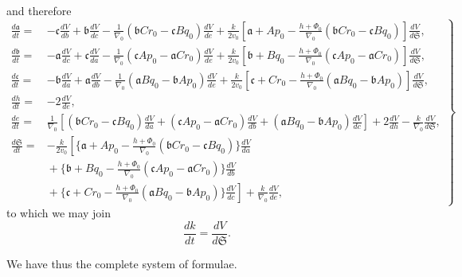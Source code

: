 \documentclass[11pt]{article}
\begin{document}
\newpage
\setcounter{page}{252}

and therefore
\[
\left.
\begin{aligned}
\frac{d\mathfrak{a}}{dt} = {}& -\mathfrak{c}\frac{dV}{db} + \mathfrak{b}\frac{dV}{dc} - \tfrac{1}{\nabla_0}(\mathfrak{b}Cr_0 - \mathfrak{c}Bq_0)\frac{dV}{de} + \tfrac{k}{2v_0}\!\left[\mathfrak{a} + Ap_0 - \tfrac{h + \Phi_0}{\nabla_0}(\mathfrak{b}Cr_0 - \mathfrak{c}Bq_0)\right]\frac{dV}{d\mathfrak{S}}, \\
\frac{d\mathfrak{b}}{dt} = {}& -\mathfrak{a}\frac{dV}{dc} + \mathfrak{c}\frac{dV}{da} - \tfrac{1}{\nabla_0}(\mathfrak{c}Ap_0 - \mathfrak{a}Cr_0)\frac{dV}{de} + \tfrac{k}{2v_0}\!\left[\mathfrak{b} + Bq_0 - \tfrac{h + \Phi_0}{\nabla_0}(\mathfrak{c}Ap_0 - \mathfrak{a}Cr_0)\right]\frac{dV}{d\mathfrak{S}}, \\
\frac{d\mathfrak{c}}{dt} = {}& -\mathfrak{b}\frac{dV}{da} + \mathfrak{a}\frac{dV}{db} - \tfrac{1}{\nabla_0}(\mathfrak{a}Bq_0 - \mathfrak{b}Ap_0)\frac{dV}{de} + \tfrac{k}{2v_0}\!\left[\mathfrak{c} + Cr_0 - \tfrac{h + \Phi_0}{\nabla_0}(\mathfrak{a}Bq_0 - \mathfrak{b}Ap_0)\right]\frac{dV}{d\mathfrak{S}}, \\
\frac{dh}{dt} = {}& -2\frac{dV}{de}, \\
\frac{de}{dt} = {}& \tfrac{1}{\nabla_0}\!\left[(\mathfrak{b}Cr_0 - \mathfrak{c}Bq_0)\frac{dV}{da} + (\mathfrak{c}Ap_0 - \mathfrak{a}Cr_0)\frac{dV}{db} + (\mathfrak{a}Bq_0 - \mathfrak{b}Ap_0)\frac{dV}{dc}\right] + 2\frac{dV}{dh} - \tfrac{k}{\nabla_0}\frac{dV}{d\mathfrak{S}}, \\
\frac{d\mathfrak{S}}{dt} = {}& -\tfrac{k}{2v_0}\!\left[\{\mathfrak{a} + Ap_0 - \tfrac{h + \Phi_0}{\nabla_0}(\mathfrak{b}Cr_0 - \mathfrak{c}Bq_0)\}\frac{dV}{da}\right. \\
& \left.{}+ \{\mathfrak{b} + Bq_0 - \tfrac{h + \Phi_0}{\nabla_0}(\mathfrak{c}Ap_0 - \mathfrak{a}Cr_0)\}\frac{dV}{db}\right. \\
& \left.{}+ \{\mathfrak{c} + Cr_0 - \tfrac{h + \Phi_0}{\nabla_0}(\mathfrak{a}Bq_0 - \mathfrak{b}Ap_0)\}\frac{dV}{dc}\right] + \tfrac{k}{\nabla_0}\frac{dV}{de},
\end{aligned}
\right\} \tag{62}
\]
to which we may join
\[
\frac{dk}{dt} = \frac{dV}{d\mathfrak{S}}. \tag{63}
\]

We have thus the complete system of formulae.

\newpage
\setcounter{page}{253}
\end{document}
